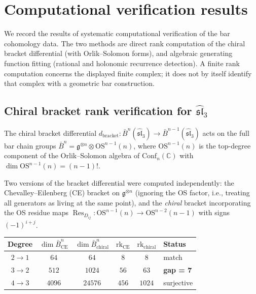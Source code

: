\section{Computational verification results}
\label{sec:computational-verification}

We record the results of systematic computational verification of the bar
cohomology data.  The two methods are direct rank
computation of the chiral bracket differential (with Orlik--Solomon forms),
and algebraic generating function fitting (rational and holonomic recurrence
detection).  A finite rank computation concerns the displayed finite complex;
it does not by itself identify that complex with a geometric bar construction.

\subsection{Chiral bracket rank verification for $\widehat{\mathfrak{sl}}_3$}
\label{subsec:chiral-bracket-verification}

The chiral bracket differential
$d_{\mathrm{bracket}}\colon \bar{B}^n(\widehat{\mathfrak{sl}}_3) \to
\bar{B}^{n-1}(\widehat{\mathfrak{sl}}_3)$
acts on the full bar chain groups
$\bar{B}^n = \mathfrak{g}^{\otimes n} \otimes \mathrm{OS}^{n-1}(n)$,
where $\mathrm{OS}^{n-1}(n)$ is the top-degree component of the
Orlik--Solomon algebra of $\mathrm{Conf}_n(\mathbb{C})$
with $\dim\mathrm{OS}^{n-1}(n) = (n-1)!$.

Two versions of the bracket differential were computed independently:
the Chevalley--Eilenberg (CE) bracket on $\mathfrak{g}^{\otimes n}$
(ignoring the OS factor, i.e., treating all generators as living at the
same point), and the \emph{chiral} bracket incorporating the OS
residue maps $\operatorname{Res}_{D_{ij}}\colon
\mathrm{OS}^{n-1}(n) \to \mathrm{OS}^{n-2}(n-1)$
with signs $(-1)^{i+j}$.

\begin{center}
\renewcommand{\arraystretch}{1.3}
\begin{tabular}{c|cc|cc|l}
\toprule
\textbf{Degree} & $\dim \bar{B}^n_{\mathrm{CE}}$ &
  $\dim \bar{B}^n_{\mathrm{chiral}}$ &
  $\mathrm{rk}_{\mathrm{CE}}$ & $\mathrm{rk}_{\mathrm{chiral}}$ &
  \textbf{Status} \\
\midrule
$2 \to 1$ & $64$ & $64$ & $8$ & $8$ & match \\
$3 \to 2$ & $512$ & $1024$ & $56$ & $63$ & \textbf{gap = 7} \\
$4 \to 3$ & $4096$ & $24576$ & $456$ & $1024$ & surjective \\
\bottomrule
\end{tabular}
\end{center}

